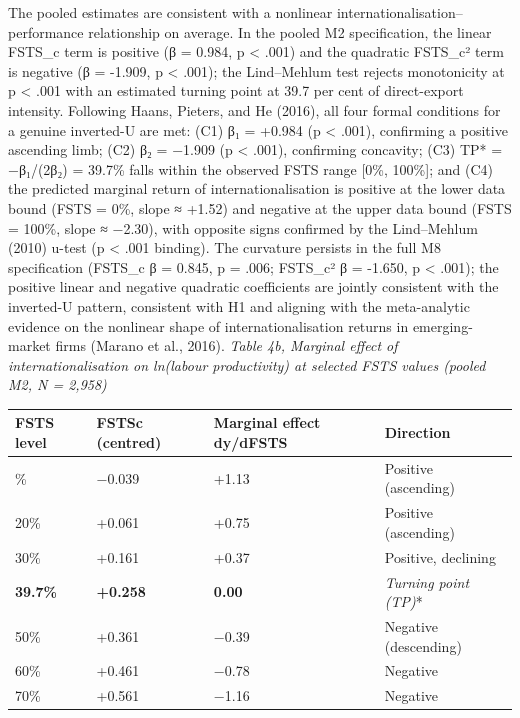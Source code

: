 \documentclass[12pt,a4paper]{article}
\begin{document}
The pooled estimates are consistent with a nonlinear
internationalisation--performance relationship on average. In the pooled
M2 specification, the linear FSTS\_c term is positive (β = 0.984, p
\textless{} .001) and the quadratic FSTS\_c² term is negative (β =
-1.909, p \textless{} .001); the Lind--Mehlum test rejects monotonicity
at p \textless{} .001 with an estimated turning point at 39.7 per cent
of direct-export intensity. Following Haans, Pieters, and He (2016), all
four formal conditions for a genuine inverted-U are met: (C1) β₁ =
+0.984 (p \textless{} .001), confirming a positive ascending limb; (C2)
β₂ = −1.909 (p \textless{} .001), confirming concavity; (C3) TP* =
−β₁/(2β₂) = 39.7\% falls within the observed FSTS range {[}0\%,
100\%{]}; and (C4) the predicted marginal return of internationalisation
is positive at the lower data bound (FSTS = 0\%, slope ≈ +1.52) and
negative at the upper data bound (FSTS = 100\%, slope ≈ −2.30), with
opposite signs confirmed by the Lind--Mehlum (2010) u-test (p
\textless{} .001 binding). The curvature persists in the full M8
specification (FSTS\_c β = 0.845, p = .006; FSTS\_c² β = -1.650, p
\textless{} .001); the positive linear and negative quadratic
coefficients are jointly consistent with the inverted-U pattern,
consistent with H1 and aligning with the meta-analytic evidence on the
nonlinear shape of internationalisation returns in emerging-market firms
(Marano et al., 2016). \emph{Table 4b, Marginal effect of
internationalisation on ln(labour productivity) at selected FSTS values
(pooled M2, N = 2,958)}

\begin{longtable}[]{@{}llll@{}}
\toprule\noalign{}
FSTS level & FSTSc (centred) & Marginal effect dy/dFSTS & Direction \\
\midrule\noalign{}
\endhead
\bottomrule\noalign{}
\endlastfoot
10\% & −0.039 & +1.13 & Positive (ascending) \\
20\% & +0.061 & +0.75 & Positive (ascending) \\
30\% & +0.161 & +0.37 & Positive, declining \\
\textbf{39.7\%} & \textbf{+0.258} & \textbf{0.00} & \emph{\emph{Turning
point (TP})}* \\
50\% & +0.361 & −0.39 & Negative (descending) \\
60\% & +0.461 & −0.78 & Negative \\
70\% & +0.561 & −1.16 & Negative \\
\end{longtable}
\end{document}
